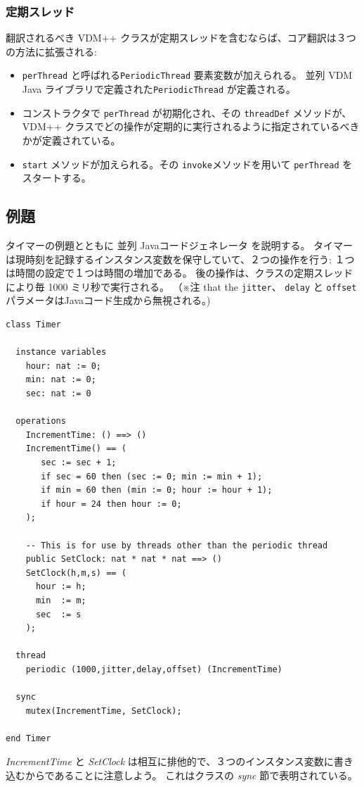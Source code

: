 \documentclass[\pformat,11pt]{jarticle}
\newcommand{\VDM}{VDM++}
\newcommand{\cg}{Javaコードジェネレータ}
\newcommand{\ccg}{並列 \cg}
\newcommand{\CJL}{並列 VDM Java ライブラリ}
\begin{document}
\subsubsection{定期スレッド}
翻訳されるべき \VDM{} クラスが定期スレッドを含むならば、コア翻訳は３つの方法に拡張される: 
\begin{itemize}
\item   \texttt{perThread} と呼ばれる\texttt{PeriodicThread} 要素変数が加えられる。 \CJL で定義された\texttt{PeriodicThread} が定義される。
\item コンストラクタで \texttt{perThread} が初期化され、その \texttt{threadDef} メソッドが、 \VDM{} クラスでどの操作が定期的に実行されるように指定されているべきかが定義されている。
\item  \texttt{start} メソッドが加えられる。その \texttt{invoke}メソッドを用いて \texttt{perThread} をスタートする。
\end{itemize}


\subsection{例題}

タイマーの例題とともに \ccg{} を説明する。
タイマーは現時刻を記録するインスタンス変数を保守していて、２つの操作を行う:
１つは時間の設定で１つは時間の増加である。 
後の操作は、クラスの定期スレッドにより毎 1000 ミリ秒で実行される。
（※注 that the \texttt{jitter}、 \texttt{delay} と \texttt{offset} パラメータはJavaコード生成から無視される。) 
\begin{verbatim}
class Timer

  instance variables
    hour: nat := 0;
    min: nat := 0;
    sec: nat := 0
  
  operations
    IncrementTime: () ==> ()
    IncrementTime() == (
       sec := sec + 1;
       if sec = 60 then (sec := 0; min := min + 1);
       if min = 60 then (min := 0; hour := hour + 1);
       if hour = 24 then hour := 0;
    );
  
    -- This is for use by threads other than the periodic thread
    public SetClock: nat * nat * nat ==> ()
    SetClock(h,m,s) == ( 
      hour := h;
      min  := m;
      sec  := s
    );
  
  thread
    periodic (1000,jitter,delay,offset) (IncrementTime)

  sync 
    mutex(IncrementTime, SetClock);
   
end Timer
\end{verbatim}
 \textit{IncrementTime} と \textit{SetClock} は相互に排他的で、３つのインスタンス変数に書き込むからであることに注意しよう。 
これはクラスの \textit{sync} 節で表明されている。
\end{document}
